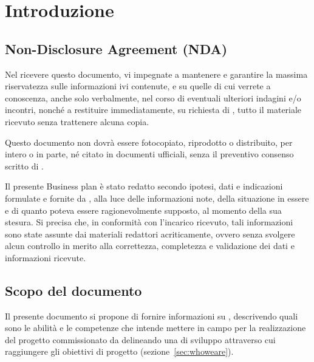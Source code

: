 \newcommand{\sharedPath}{../shared}
\newcommand{\doctitle}{Business Plan}








\section{Introduzione}

\subsection{Non-Disclosure Agreement (NDA)}
Nel ricevere questo documento, vi impegnate a mantenere e garantire la massima riservatezza sulle informazioni ivi contenute, e su quelle di cui verrete a conoscenza, anche solo verbalmente, nel corso di eventuali ulteriori indagini e/o incontri, nonché a restituire immediatamente, su richiesta di \team, tutto il materiale ricevuto senza trattenere alcuna copia.

Questo documento non dovrà essere fotocopiato, riprodotto o distribuito, per intero o in parte, né citato in
documenti ufficiali, senza il preventivo consenso scritto di \team.

Il presente Business plan è stato redatto secondo ipotesi, dati e indicazioni formulate e fornite da \customer, alla luce delle informazioni note, della situazione in essere e di quanto poteva essere ragionevolmente supposto, al momento della sua stesura. Si precisa che, in conformità con l'incarico ricevuto, tali informazioni sono state assunte dai materiali redattori acriticamente, ovvero senza svolgere alcun controllo in merito alla correttezza, completezza e validazione dei dati e informazioni ricevute.


\subsection{Scopo del documento}
Il presente documento si propone di fornire informazioni su \team, descrivendo quali sono le abilità e le competenze che intende mettere in campo per la realizzazione del progetto commissionato da \customer delineando una  di sviluppo attraverso cui raggiungere gli obiettivi di progetto (sezione~\ref{sec:whoweare}).

